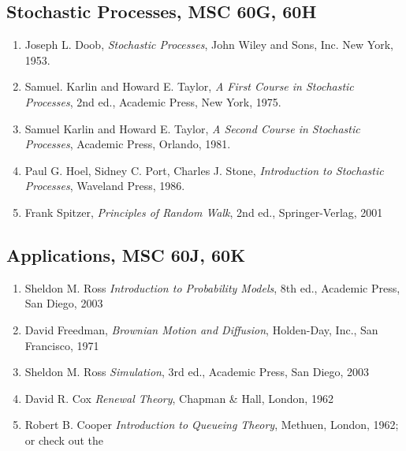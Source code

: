 \documentclass[12pt]{article}
\begin{document}
\subsection*{Stochastic Processes, MSC 60G, 60H}
\begin{enumerate}
\item Joseph L. Doob, \emph{Stochastic Processes},
John Wiley and Sons, Inc. New York, 1953.
\item Samuel. Karlin and Howard E. Taylor, \emph{A First Course in Stochastic
Processes}, 2nd ed., Academic Press, New York, 1975.
\item Samuel Karlin and Howard E. Taylor, \emph{A Second Course in Stochastic Processes},
Academic Press, Orlando, 1981.
\item Paul G. Hoel, Sidney C. Port, Charles J. Stone, \emph{Introduction to Stochastic
Processes}, Waveland Press, 1986.
\item Frank Spitzer, \emph{Principles of Random Walk}, 2nd ed.,
Springer-Verlag, 2001
\end{enumerate}

\subsection*{Applications, MSC 60J, 60K}
\begin{enumerate}
\item Sheldon M. Ross \emph{Introduction to Probability Models}, 8th
ed., Academic Press, San Diego, 2003
\item David Freedman, \emph{Brownian Motion and Diffusion}, Holden-Day, Inc.,
San Francisco, 1971
\item Sheldon M. Ross \emph{Simulation}, 3rd ed., Academic Press, San Diego, 2003
\item David R. Cox \emph{Renewal Theory}, Chapman \& Hall, London, 1962
\item Robert B. Cooper \emph{Introduction to Queueing Theory}, Methuen, London,
1962; or check out the 
\end{enumerate}
\end{document}
